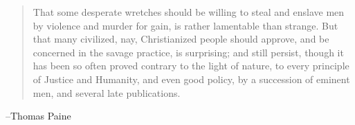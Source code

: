 \documentclass[letterpaper, landscape]{exam}
\begin{document}
  \fi
  \ifprintanswers{}
  \else
    \vspace{8 cm}
    \begin{quote}
      \begin{em}
        That some desperate wretches should be willing to steal and enslave men by
        violence and murder for gain, is rather lamentable than strange. But that many
        civilized, nay, Christianized people should approve, and be concerned in the
        savage practice, is surprising; and still persist, though it has been so often
        proved contrary to the light of nature, to every principle of Justice and
        Humanity, and even good policy, by a succession of eminent men, and several
        late publications.
      \end{em}
    \end{quote}
    \hspace{2 cm}--Thomas Paine
  \fi
\end{document}
